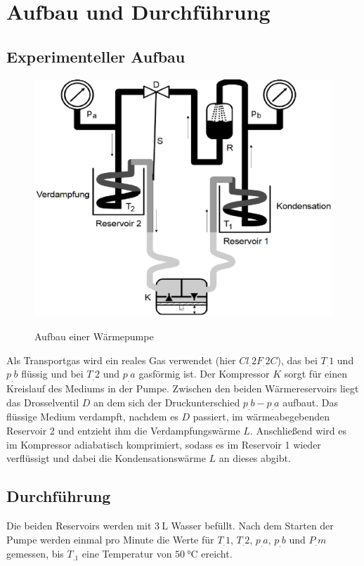
\section{Aufbau und Durchführung}
\label{sec:Durchführung}
\subsection{Experimenteller Aufbau}
\begin{figure}
\caption{Aufbau einer Wärmepumpe\cite{V206}}
\includegraphics[scale=0.5]{content/images/aufbau.eps}
\label{fig:abb1}
\end{figure}
\noindent Als Transportgas wird ein reales Gas verwendet (hier $Cl_.{2}F_.{2}C$), das bei $T_.{1}$ und $p_.{b}$ flüssig und bei $T_.{2}$ und $p_.{a}$ gasförmig ist.
Der Kompressor $K$ sorgt für einen Kreislauf des Mediums in der Pumpe.\newline
Zwischen den beiden Wärmereservoirs liegt das Drosselventil $D$
an dem sich der Druckunterschied $p_.{b}-p_.{a}$ aufbaut.\newline
Das flüssige Medium verdampft, nachdem es $D$ passiert, im wärmeabegebenden Reservoir 2 und entzieht ihm die Verdampfungswärme $L$.
Anschließend wird es im Kompressor adiabatisch komprimiert, sodass es im Reservoir 1 wieder verflüssigt und dabei die Kondensationswärme $L$ an dieses abgibt.
\subsection{Durchführung}
Die beiden Reservoirs werden mit $\SI{3}{\liter}$ Wasser befüllt.\newline
Nach dem Starten der Pumpe werden einmal pro Minute die Werte für $T_.{1}$, $T_.{2}$, $p_.{a}$, $p_.{b}$ und $P_.{m}$ gemessen, bis $T_.1$ eine Temperatur von $\SI{50}{\celsius}$ ereicht.